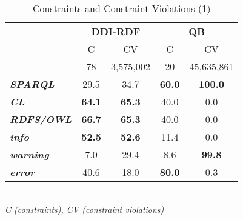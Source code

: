 \documentclass[conference]{IEEEtran}
\begin{document}

\begin{table}[H]
		\scriptsize
    \begin{center}
		\caption{Constraints and Constraint Violations (1)}
		\label{tab:evaluation-constraint-violations-1}
    \begin{tabular}{@{}lcccc@{}}
		\hline
    \multirow{2}{*}{} &
      \multicolumn{2}{c}{\textbf{DDI-RDF}} &
      \multicolumn{2}{c}{\textbf{QB}} \\
    \textbf{} & C & CV & C & CV \\
    \hline
		 & 78 & 3,575,002 & 20 & 45,635,861 \\
		\hline
		\textbf{\emph{SPARQL}} & 29.5 & 34.7 & \textbf{60.0} & \textbf{100.0} \\
		\textbf{\emph{CL}} & \textbf{64.1} & \textbf{65.3} & 40.0 & 0.0 \\
		\textbf{\emph{RDFS/OWL}} & \textbf{66.7} & \textbf{65.3} & 40.0 & 0.0 \\
		\hline
		\textbf{\emph{info}} & \textbf{52.5} & \textbf{52.6} & 11.4 & 0.0 \\
		\textbf{\emph{warning}} & 7.0 & 29.4 & 8.6 & \textbf{99.8} \\
		\textbf{\emph{error}} & 40.6 & 18.0 & \textbf{80.0} & 0.3 \\
    \bottomrule
    \end{tabular}
    \\ \emph{C (constraints), CV (constraint violations)}
    \end{center}
\end{table}
\end{document}
